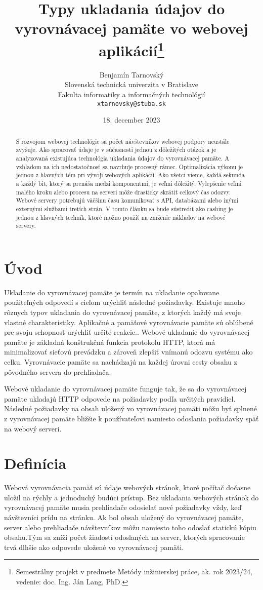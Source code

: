 \documentclass[10pt,oneside,slovak,a4paper]{article}
\title{Typy ukladania údajov do vyrovnávacej pamäte vo webovej aplikácií\thanks{Semestrálny projekt v predmete Metódy inžinierskej práce, ak. rok 2023/24, vedenie: doc. Ing. Ján Lang, PhD.}}
\author{Benjamín Tarnovský\\[2pt]
	{\small Slovenská technická univerzita v Bratislave}\\
	{\small Fakulta informatiky a informačných technológií}\\
	{\small \texttt{xtarnovsky@stuba.sk}}
	}
\date{\small 18. december 2023}
\begin{document}
\maketitle

\begin{abstract}

S rozvojom webovej technológie sa počet návštevníkov webovej podpory neustále zvyšuje.
Ako spracovať  údaje je v súčasnosti jednou z dôležitých otázok a je analyzovaná existujúca technológia ukladania údajov do vyrovnávacej pamäte.
A vzhľadom na ich nedostatočnosť sa navrhuje procesný rámec. Optimalizácia výkonu je jednou z hlavných tém pri vývoji webových aplikácií.
Ako všetci vieme, každá sekunda a každý bit, ktorý sa prenáša medzi komponentmi, je veľmi dôležitý.
Vylepšenie veľmi malého kroku alebo procesu na serveri môže drasticky skrátiť celkový čas odozvy.
Webové servery potrebujú väčšinu času komunikovať s API, databázami alebo inými externými službami tretích strán.
V tomto článku sa bude sústrediť ako cashing je jednou z hlavných techník, ktoré možno použiť na zníženie nákladov na webové servery.

\end{abstract}

\section{Úvod} 
\quad Ukladanie do vyrovnávacej pamäte je termín na ukladanie opakovane použiteľných odpovedí s cieľom urýchliť následné požiadavky. Existuje mnoho rôznych typov ukladania do vyrovnávacej pamäte, z ktorých každý má svoje vlastné charakteristiky. Aplikačné a pamäťové vyrovnávacie pamäte sú obľúbené pre svoju schopnosť urýchliť určité reakcie.. Webové ukladanie do vyrovnávacej pamäte je základná konštrukčná funkcia protokolu HTTP, ktorá má minimalizovať sieťovú prevádzku a zároveň zlepšiť vnímanú odozvu systému ako celku. Vyrovnávacie pamäte sa nachádzajú na každej úrovni cesty obsahu z pôvodného servera do prehliadača.

Webové ukladanie do vyrovnávacej pamäte funguje tak, že sa do vyrovnávacej pamäte ukladajú HTTP odpovede na požiadavky podľa určitých pravidiel. Následné požiadavky na obsah uložený vo vyrovnávacej pamäti môžu byť splnené z vyrovnávacej pamäte bližšie k používateľovi namiesto odoslania požiadavky späť na webový serveri. 

\section{Definícia } \label{definicia}
\quad Webová vyrovnávacia pamäť sú údaje webových stránok, ktoré počítač dočasne uložil na rýchly a jednoduchý budúci prístup. Bez ukladania webových stránok do vyrovnávacej pamäte musia prehliadače odosielať nové požiadavky vždy, keď návštevníci prídu na  stránku. Ak bol  obsah uložený do vyrovnávacej pamäte,  server alebo prehliadače návštevníkov môžu namiesto toho odoslať statickú kópiu  obsahu.Tým sa zníži počet žiadostí odoslaných na  server, ktorých spracovanie trvá dlhšie ako odpovede uložené vo vyrovnávacej pamäti. 
\end{document}
